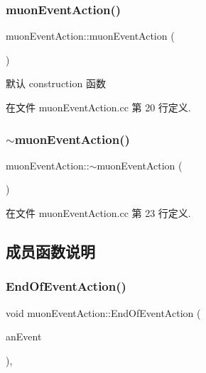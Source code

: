 \subsubsection{\texorpdfstring{muon\+Event\+Action()}{muonEventAction()}}
{\footnotesize\ttfamily muon\+Event\+Action\+::muon\+Event\+Action (\begin{DoxyParamCaption}{ }\end{DoxyParamCaption})}



默认 construction 函数 



在文件 muon\+Event\+Action.\+cc 第 20 行定义.

\mbox{\label{classmuonEventAction_ae268609426bf99b1459f72e21215fdc4}} 
\subsubsection{\texorpdfstring{$\sim$muon\+Event\+Action()}{~muonEventAction()}}
{\footnotesize\ttfamily muon\+Event\+Action\+::$\sim$muon\+Event\+Action (\begin{DoxyParamCaption}{ }\end{DoxyParamCaption})\hspace{0.3cm}{\ttfamily [virtual]}}



在文件 muon\+Event\+Action.\+cc 第 23 行定义.



\subsection{成员函数说明}
\mbox{\label{classmuonEventAction_a674e82851a04669f19294aae5e4a69e6}} 
\subsubsection{\texorpdfstring{End\+Of\+Event\+Action()}{EndOfEventAction()}}
{\footnotesize\ttfamily void muon\+Event\+Action\+::\+End\+Of\+Event\+Action (\begin{DoxyParamCaption}\item[{const G4\+Event $\ast$}]{an\+Event }\end{DoxyParamCaption})\hspace{0.3cm}{\ttfamily [override]}, {\ttfamily [virtual]}}



